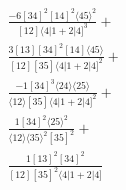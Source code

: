 \documentclass[varwidth, border=5pt]{standalone}
\begin{document}
\begin{my}
$\begin{gathered}
\scriptscriptstyle\frac{-6[34]^2[14]^2⟨45⟩^2}{[12]⟨4|1+2|4]^3}+\\
\scriptscriptstyle\frac{3[13][34]^2[14]⟨45⟩}{[12][35]⟨4|1+2|4]^2}+\\
\scriptscriptstyle\frac{-1[34]^3⟨24⟩⟨25⟩}{⟨12⟩[35]⟨4|1+2|4]^2}+\\
\scriptscriptstyle\frac{1[34]^2⟨25⟩^2}{⟨12⟩⟨35⟩^2[35]^2}+\\
\scriptscriptstyle\frac{1[13]^2[34]^2}{[12][35]^2⟨4|1+2|4]}\phantom{+}
\end{gathered}$
\end{my}
\end{document}
